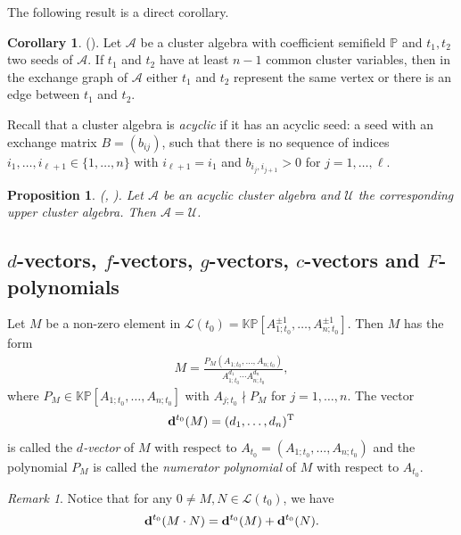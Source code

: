 \documentclass{amsart}
\newtheorem{proposition}[theorem]{Proposition}
\theoremstyle{definition}
\newtheorem{corollary}[theorem]{Corollary}
\theoremstyle{remark}
\newtheorem{remark}[theorem]{Remark}
\numberwithin{equation}{section}
\begin{document}
 The following result is a direct corollary.
\begin{corollary}{\rm (}\cite[Corollary 3]{CL1}{\rm ).}
\label{corn-1} 
Let $\mathcal A$ be a cluster algebra with coefficient semifield $\mathbb P$ and $t_1,t_2$ two seeds of $\mathcal A$. If $t_1$ and $t_2$ have at least $n-1$ common cluster variables, then in the exchange graph of $\mathcal A$ either $t_1$ and $t_2$ represent the same vertex or there is an edge between $t_1$ and $t_2$.
\end{corollary}

Recall that a cluster algebra is {\em acyclic} if it has an acyclic seed: a seed with an exchange matrix $B=(b_{ij})$, such
that there is no sequence of indices $i_1,\ldots,i_{\ell+1}\in\{1,\ldots,n\}$ with  $i_{\ell+1}=i_1$ and $b_{i_j,i_{j+1}}>0$  for $j=1,\ldots,\ell$.


\begin{proposition}{\rm (}\cite{BFZ}, \cite[Theorem 2]{M}{\rm ).}
\label{proacyclic}
Let $\mathcal A$ be an acyclic cluster algebra and $\mathcal U$ the corresponding upper cluster algebra. Then $\mathcal A=\mathcal U$.
\end{proposition}

\subsection{\texorpdfstring{$d$}{Lg}-vectors, \texorpdfstring{$f$}{Lg}-vectors, \texorpdfstring{$g$}{Lg}-vectors, \texorpdfstring{$c$}{Lg}-vectors and \texorpdfstring{$F$}{Lg}-polynomials}
Let $M$ be a non-zero element in ${\mathcal L}(t_0)=\mathbb{KP}[A_{1;t_0}^{\pm1},\ldots,A_{n;t_0}^{\pm1}]$. Then $M$ has the form
\begin{eqnarray}
M=\frac{P_M(A_{1;t_0},\ldots,A_{n;t_0})}{A_{1;t_0}^{d_1}\cdots A_{n;t_0}^{d_n}},\nonumber
\end{eqnarray}
where $P_M\in\mathbb {KP}[A_{1;t_0},\ldots,A_{n;t_0}]$ with  $A_{j;t_0}\nmid P_M$ for $j=1,\ldots,n$.
The vector $${\bf d}^{t_0}(M) = (d_1,\ldots, d_n)^{\rm T}$$ is called the  {\em $d$-vector} of  $M$ with respect to $A_{t_0}=(A_{1;t_0},\ldots,A_{n;t_0})$ and the polynomial $P_M$ is called the {\em numerator polynomial} of $M$ with respect to $A_{t_0}$.


\begin{remark}\label{rmkdadd}
Notice that for any $0\neq M,N\in\mathcal L(t_0)$, we have $${\bf d}^{t_0}(M\cdot N)={\bf d}^{t_0}(M)+{\bf d}^{t_0}(N).$$
\end{remark}
\end{document}
